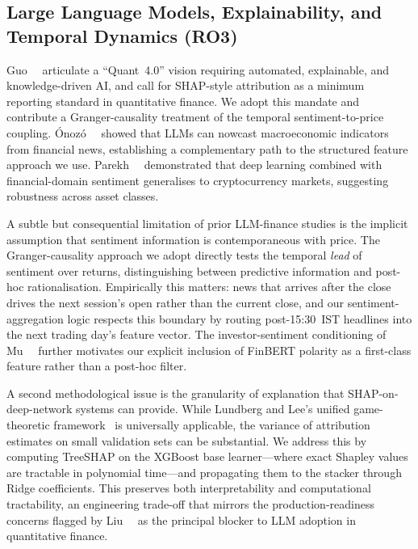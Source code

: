\subsection{Large Language Models, Explainability, and Temporal Dynamics (RO3)}

Guo~\etal~\cite{guo2024quant40} articulate a ``Quant~4.0'' vision requiring
automated, explainable, and knowledge-driven AI, and call for SHAP-style
attribution as a minimum reporting standard in quantitative finance. We adopt
this mandate and contribute a Granger-causality treatment of the temporal
sentiment-to-price coupling. \'{O}noz\'{o}~\etal~\cite{onozo2024llms} showed
that LLMs can nowcast macroeconomic indicators from financial news, establishing
a complementary path to the structured feature approach we use. Parekh~\etal~\cite{parekh2022dlguess}
demonstrated that deep learning combined with financial-domain sentiment
generalises to cryptocurrency markets, suggesting robustness across asset classes.

A subtle but consequential limitation of prior LLM-finance studies is the
implicit assumption that sentiment information is contemporaneous with price.
The Granger-causality approach we adopt directly tests the temporal
\emph{lead} of sentiment over returns, distinguishing between predictive
information and post-hoc rationalisation. Empirically this matters: news
that arrives after the close drives the next session's open rather than
the current close, and our sentiment-aggregation logic respects this
boundary by routing post-15:30~IST headlines into the next trading day's
feature vector. The investor-sentiment conditioning of Mu~\etal~\cite{mu2023investor}
further motivates our explicit inclusion of FinBERT polarity as a first-class
feature rather than a post-hoc filter.

A second methodological issue is the granularity of explanation that
SHAP-on-deep-network systems can provide. While Lundberg and Lee's
unified game-theoretic framework~\cite{lundberg2017shap} is universally
applicable, the variance of attribution estimates on small validation sets
can be substantial. We address this by computing TreeSHAP on the XGBoost
base learner---where exact Shapley values are tractable in polynomial
time---and propagating them to the stacker through Ridge coefficients. This
preserves both interpretability and computational tractability, an engineering
trade-off that mirrors the production-readiness concerns flagged by
Liu~\etal~\cite{liu2024llms} as the principal blocker to LLM adoption in
quantitative finance.

